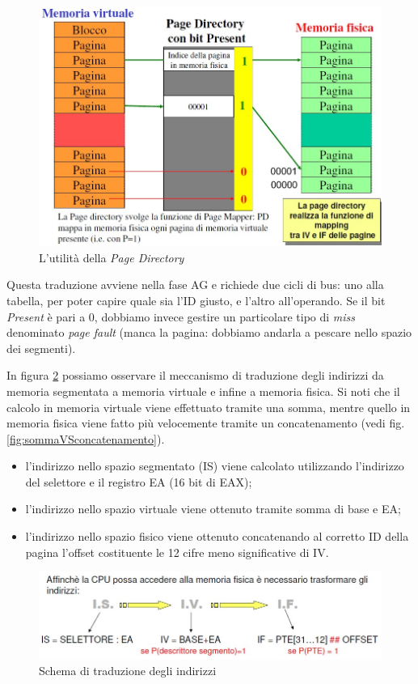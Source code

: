 \begin{figure}[!h]
\centering
\includegraphics[width=0.85\columnwidth]{img/memoriaVirtFis}
\caption{L'utilità della \textit{Page Directory}}
\label{fig:memoriaVirtFis}
\end{figure}

Questa traduzione avviene nella fase AG e richiede due cicli di bus: uno alla tabella, per poter capire quale sia l'ID giusto, e l'altro all'operando. Se il bit \textit{Present} è pari a 0, dobbiamo invece gestire un particolare tipo di \textit{miss} denominato \textit{page fault} (manca la pagina: dobbiamo andarla a pescare nello spazio dei segmenti).

In figura \ref{fig:indirizzamento} possiamo osservare il meccanismo di traduzione degli indirizzi da memoria segmentata a memoria virtuale e infine a memoria fisica. Si noti che il calcolo in memoria virtuale viene effettuato tramite una somma, mentre quello in memoria fisica viene fatto più velocemente tramite un concatenamento (vedi fig. \ref{fig:sommaVSconcatenamento}).
\begin{itemize}
\item l'indirizzo nello spazio segmentato (IS) viene calcolato utilizzando l'indirizzo del selettore e il registro EA (16 bit di EAX);
\item l'indirizzo nello spazio virtuale viene ottenuto tramite somma di base e EA;
\item l'indirizzo nello spazio fisico viene ottenuto concatenando al corretto ID della pagina l'offset costituente le 12 cifre meno significative di IV. 
\end{itemize}

\begin{figure}[!h]
\centering
\includegraphics[width=0.85\columnwidth]{img/indirizzamento}
\caption{Schema di traduzione degli indirizzi}
\label{fig:indirizzamento}
\end{figure}

